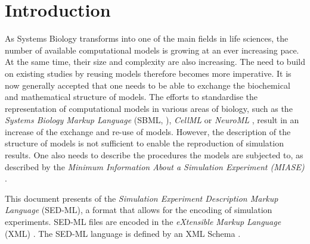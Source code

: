 \section{Introduction}

As Systems Biology transforms into one of the main fields in life sciences, the number of available computational models is growing at an ever increasing pace. At the same time, their size and complexity are also increasing. The need to build on existing studies by reusing models therefore becomes more imperative. It is now generally accepted that one needs to be able to exchange the biochemical and mathematical structure of models. The efforts to standardise the representation of computational models in various areas of biology, such as the \emph{Systems Biology Markup Language} (SBML, \citet{Hucka:2003}), \emph{CellML} \citet{Lloyd:2004} or \emph{NeuroML} \citet{Goddard:2001}, result in an increase of the exchange and re-use of models. However, the description of the structure of models is not sufficient to enable the reproduction of simulation results. 
One also needs to describe the procedures the models are subjected to, as described by the 
\emph{Minimum Information About a Simulation Experiment (MIASE)} \citep{Waltemath:2010}. 

This document presents  \LoneVone of the \emph{Simulation Experiment Description Markup Language} (SED-ML), a format that allows for the encoding of simulation experiments. SED-ML files are encoded in the \emph{eXtensible Markup Language} (XML) \citep{Bray:2006}. The SED-ML language is defined by an XML Schema \citep{Fallside:2001}. 

